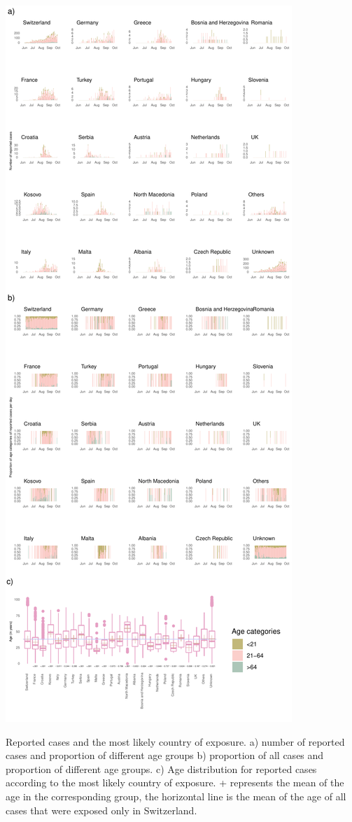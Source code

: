 \documentclass[10pt, a4paper, twoside]{article}
\begin{document}
\clearpage
\begin{suppfigure}[h]
\centering
\includegraphics[scale=0.5]{SF3_2021-04-20.pdf}
\caption{Reported cases and the most likely country of exposure. a) number of reported cases and proportion of different age groups b) proportion of all cases and proportion of different age groups. c) Age distribution for reported cases according to the most likely country of exposure. + represents the mean of the age in the corresponding group, the horizontal line is the mean of the age of all cases that were exposed only in Switzerland.}
\label{sf3}
\end{suppfigure}
\end{document}
